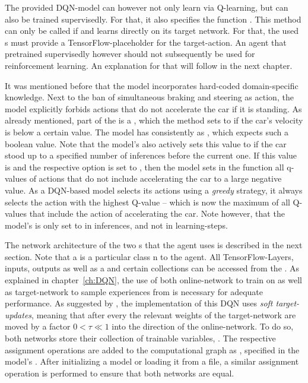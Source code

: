 The provided DQN-model can however not only learn via Q-learning, but can also be trained supervisedly. For that, it also specifies the function . This method can only be called if  and learns directly on its target network. For that, the used s must provide a TensorFlow-placeholder for the target-action. An agent that pretrained supervisedly however should not subsequently be used for reinforcement learning. An explanation for that will follow in the next chapter.

It was mentioned before that the model incorporates hard-coded domain-specific knowledge. Next to the ban of simultaneous braking and steering as action, the model explicitly forbids actions that do not accelerate the car if it is standing. As already mentioned, part of the  is a , which the method  sets to  if the car's velocity is below a certain value. The model has consistently as , which expects such a boolean value. Note that the model's  also actively sets this value to  if the car stood up to a specified number of inferences before the current one. If this value is  and the respective option  is set to , then the model sets in the function  all q-values of actions that do not include accelerating the car to a large negative value. As a DQN-based model selects its actions using a \textit{greedy} strategy, it always selects the action with the highest Q-value -- which is now the maximum of all Q-values that include the action of accelerating the car. Note however, that the model's  is only set to  in inferences, and not in learning-steps.

The network architecture of the two s that the agent uses is described in the next section. Note that a  is a particular class n to the agent. All TensorFlow-Layers, inputs, outputs as well as a  and certain collections can be accessed from the . As explained in chapter~\ref{ch:DQN}, the use of both online-network to train on as well as target-network to sample experiences from is necessary for adequate performance. As suggested by \cite{lillicrap_continuous_2015}, the implementation of this DQN uses \textit{soft target-updates}, meaning that after every  the relevant weights of the target-network are moved by a factor $0 < \tau \ll 1$ into the direction of the online-network. To do so, both networks store their collection of trainable variables,  . The respective assignment operations are added to the computational graph as , specified in the model's . After initializing a model or loading it from a file, a similar assignment operation is performed to ensure that both networks are equal.

